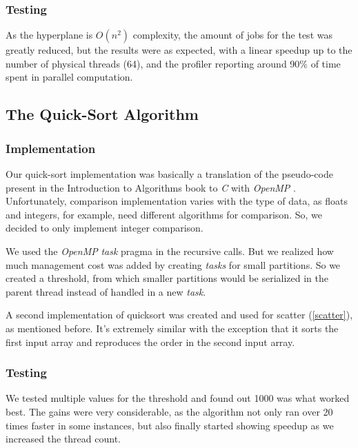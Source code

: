 \documentclass[10pt,journal]{IEEEtran}
\begin{document}
\subsubsection{Testing}

As the hyperplane is $ O(n^2) $ complexity, the amount of jobs for the test was greatly reduced, but the results were as expected, with a linear speedup up to the number of physical threads (64), and the profiler reporting around 90\% of time spent in parallel computation.

\subsection{The Quick-Sort Algorithm}

\subsubsection{Implementation}

Our quick-sort implementation was basically a translation of the pseudo-code present in the Introduction to Algorithms book to \textit{C} with \textit{OpenMP} \cite{introalgs}. Unfortunately, comparison implementation varies with the type of data, as floats and integers, for example, need different algorithms for comparison. So, we decided to only implement integer comparison.

We used the \textit{OpenMP} \textit{task} pragma in the recursive calls. But we realized how much management cost was added by creating \textit{tasks} for small partitions. So we created a threshold, from which smaller partitions would be serialized in the parent thread instead of handled in a new \textit{task}.

A second implementation of quicksort was created and used for scatter (\ref{scatter}), as mentioned before. It's extremely similar with the exception that it sorts the first input array and reproduces the order in the second input array.

\subsubsection{Testing}

We tested multiple values for the threshold and found out 1000 was what worked best. The gains were very considerable, as the algorithm not only ran over 20 times faster in some instances, but also finally started showing speedup as we increased the thread count.
\end{document}
